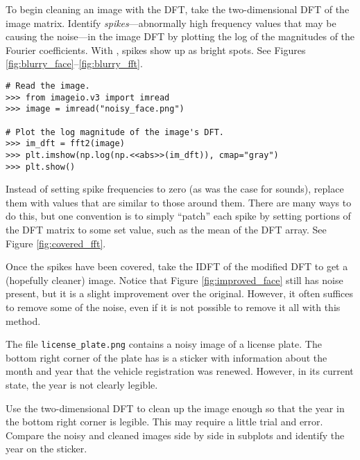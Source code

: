 To begin cleaning an image with the DFT, take the two-dimensional DFT of the image matrix.
Identify \emph{spikes}---abnormally high frequency values that may be causing the noise---in the image DFT by plotting the log of the magnitudes of the Fourier coefficients.
With , spikes show up as bright spots.
See Figures \ref{fig:blurry_face}--\ref{fig:blurry_fft}.

\begin{lstlisting}
# Read the image.
>>> from imageio.v3 import imread
>>> image = imread("noisy_face.png")

# Plot the log magnitude of the image's DFT.
>>> im_dft = fft2(image)
>>> plt.imshow(np.log(np.<<abs>>(im_dft)), cmap="gray")
>>> plt.show()
\end{lstlisting}

Instead of setting spike frequencies to zero (as was the case for sounds), replace them with values that are similar to those around them.
There are many ways to do this, but one convention is to simply ``patch'' each spike by setting portions of the DFT matrix to some set value, such as the mean of the DFT array.
See Figure \ref{fig:covered_fft}.

Once the spikes have been covered, take the IDFT of the modified DFT to get a (hopefully cleaner) image.
Notice that Figure \ref{fig:improved_face} still has noise present, but it is a slight improvement over the original.
However, it often suffices to remove some of the noise, even if it is not possible to remove it all with this method.

\begin{problem} %
The file \texttt{license\_plate.png} contains a noisy image of a license plate.
The bottom right corner of the plate has is a sticker with information about the month and year that the vehicle registration was renewed.
However, in its current state, the year is not clearly legible.

Use the two-dimensional DFT to clean up the image enough so that the year in the bottom right corner is legible.
This may require a little trial and error.
Compare the noisy and cleaned images side by side in subplots and identify the year on the sticker.
\end{problem}

